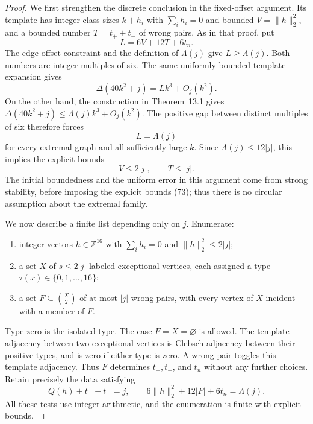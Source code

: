 \begin{proof}
We first strengthen the discrete conclusion in the fixed-offset
argument. Its template has integer class sizes $k+h_i$ with
$\sum_i h_i=0$ and bounded $V=\lVert h\rVert_2^2$, and a bounded number
$T=t_++t_-$ of wrong pairs. As in that proof, put
\[
 L=6V+12T+6t_n.
\]
The edge-offset constraint and the definition of $\Lambda(j)$ give
$L\geq\Lambda(j)$. Both numbers are integer multiples of six. The same
uniformly bounded-template expansion gives
\[
 \Delta(40k^2+j)=Lk^3+O_j(k^2).
\]
On the other hand, the construction in Theorem~13.1 gives
$\Delta(40k^2+j)\leq\Lambda(j)k^3+O_j(k^2)$. The positive gap between
distinct multiples of six therefore forces
\begin{equation}\tag{72}\label{eq:energy-equality}
 L=\Lambda(j)
\end{equation}
for every extremal graph and all sufficiently large $k$. Since
$\Lambda(j)\leq12|j|$, this implies the explicit bounds
\begin{equation}\tag{73}\label{eq:explicit-discrete-bounds}
 V\leq2|j|,\qquad T\leq|j|.
\end{equation}
The initial boundedness and the uniform error in this argument come
from strong stability, before imposing the explicit bounds (73); thus
there is no circular assumption about the extremal family.

We now describe a finite list depending only on $j$. Enumerate:
\begin{enumerate}
\item integer vectors $h\in\mathbb Z^{16}$ with $\sum_i h_i=0$ and
      $\lVert h\rVert_2^2\leq2|j|$;
\item a set $X$ of $s\leq2|j|$ labeled exceptional vertices, each
      assigned a type $\tau(x)\in\{0,1,\ldots,16\}$;
\item a set $F\subseteq\binom{X}{2}$ of at most $|j|$ wrong pairs, with
      every vertex of $X$ incident with a member of $F$.
\end{enumerate}
Type zero is the isolated type. The case $F=X=\varnothing$ is allowed.
The template adjacency between two exceptional vertices is Clebsch
adjacency between their positive types, and is zero if either type is
zero. A wrong pair toggles this template adjacency. Thus $F$ determines
$t_+,t_-$, and $t_n$ without any further choices. Retain precisely the
data satisfying
\begin{equation}\tag{74}\label{eq:admissible-data}
 Q(h)+t_+-t_-=j,\qquad
 6\lVert h\rVert_2^2+12|F|+6t_n=\Lambda(j).
\end{equation}
All these tests use integer arithmetic, and the enumeration is finite
with explicit bounds.


\end{proof}

